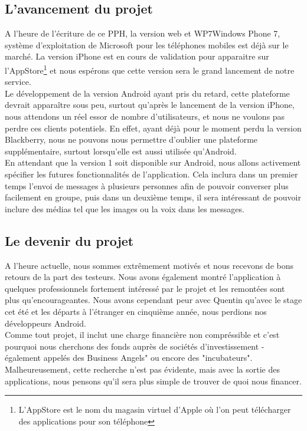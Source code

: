 \documentclass{article}
\begin{document}
	\subsection{L'avancement du projet}
	A l'heure de l'écriture de ce PPH, la version web et WP7{Windows Phone 7, système d'exploitation de Microsoft pour les téléphones mobiles} est déjà sur le marché. La version iPhone est en cours de validation pour apparaitre sur l'AppStore\footnote{L'AppStore est le nom du magasin virtuel d'Apple où l'on peut télécharger des applications pour son téléphone} et nous espérons que cette version sera le grand lancement de notre service. \\
	
	Le développement de la version Android ayant pris du retard, cette plateforme devrait apparaître sous peu, surtout qu'après le lancement de la version iPhone, nous attendons un réel essor de nombre d'utilisateurs, et nous ne voulons pas perdre ces clients potentiels. En effet, ayant déjà pour le moment perdu la version Blackberry, nous ne pouvons nous permettre d'oublier une plateforme supplémentaire, surtout lorsqu'elle est aussi utilisée qu'Android. \\
	
	En attendant que la version 1 soit disponible sur Android, nous allons activement spécifier les futures fonctionnalités de l'application. Cela inclura dans un premier temps l'envoi de messages à plusieurs personnes afin de pouvoir converser plus facilement en groupe, puis dans un deuxième temps, il sera intéressant de pouvoir inclure des médias tel que les images ou la voix dans les messages.  
	
	\subsection{Le devenir du projet}
	A l'heure actuelle, nous sommes extrêmement motivés et nous recevons de bons retours de la part des testeurs. Nous avons également montré l'application à quelques professionnels fortement intéressé par le projet et les remontées sont plus qu'encourageantes.  Nous avons cependant peur avec Quentin qu'avec le stage cet été et les départs à l'étranger en cinquième année, nous perdions nos développeurs Android. \\
	
	Comme tout projet, il inclut une charge financière non compréssible et c'est pourquoi nous cherchons des fonds auprès de sociétés d'investissement - également appelés des Business Angels" ou encore des "incubateurs". Malheureusement, cette recherche n’est pas évidente, mais avec la sortie des applications, nous pensons qu’il sera plus simple de trouver de quoi nous financer.  
	
\end{document}
